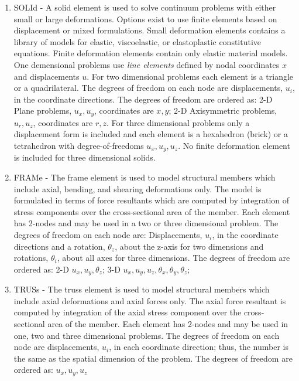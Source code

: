 \begin{enumerate}
\item
SOLId - A solid element is used to solve continuum problems with
either small or large deformations.  Options exist to use finite
elements based on displacement or mixed formulations.
Small deformation elements contains a library of
models for elastic, viscoelastic, or elastoplastic constitutive equations.
Finite deformation elements contain only elastic material models.
One demensional problems use \textit{line elements} defined by nodal
coordinates $x$ and displacements $u$.
For two dimensional problems each element is a triangle or a quadrilateral.
The degrees of freedom on each node are displacements,
$u_i$, in the coordinate directions.
The degrees of freedom are ordered as:
2-D Plane problems, $u_x , u_y $, coordinates are $x , y$;
2-D Axisymmetric problems, $u_r , u_z $, coordinates are $r , z$.
For three dimensional problems only a displacement form is included and each
element is a hexahedron (brick) or a tetrahedron
with degree-of-freedoms $u_x , u_y , u_z$.
No finite deformation element is included for three dimensional solids.

\item
FRAMe - The frame element is used to model structural members which include
axial, bending, and shearing deformations only.  The model is formulated in
terms of force resultants which are computed by integration of stress components
over the cross-sectional area of the member.
Each element has 2-nodes and may be used in a two or three dimensional
problem.  The degrees of freedom on each node are: Displacements, $u_i$, in the
coordinate directions and a rotation, $\theta_z$, about the z-axis
for two dimensions
and rotations, $\theta_i$, about all axes for three dimensions.
The degrees of freedom are ordered as:
2-D $u_x , u_y , \theta_z$;
3-D $u_x , u_y , u_z , \theta_x , \theta_y , \theta_z$;

\item
TRUSs - The truss element is used to model structural members which include
axial deformations and axial forces only.  The axial
force resultant is computed by integration of the axial stress component
over the cross-sectional area of the member.
Each element has 2-nodes and may be used in one, two and three dimensional
problems.  The degrees of freedom on each node are displacements, $u_i$, in each
coordinate direction; thus, the number is the same as the spatial dimension
of the problem.
The degrees of freedom are ordered as: $u_x , u_y , u_z$


\end{enumerate}
